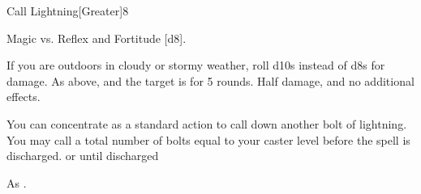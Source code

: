 \begin{spellsection}{Call Lightning}[Greater]{8}
\begin{spellheader}
\end{spellheader}
\begin{spellcontent}
    \begin{spelltargetinginfo}
    \end{spelltargetinginfo}
    \begin{spelleffects}
        \begin{spellattack}{Magic vs. Reflex and Fortitude}
            \spellsuccess[Reflex] [d8].
            
            If you are outdoors in cloudy or stormy weather, roll d10s instead of d8s for damage.
             As above, and the target is \staggered for 5 rounds.
            \spellfailure[Reflex] Half damage, and no additional effects.
        \end{spellattack}
        \spelleffect You can concentrate as a standard action to call down another bolt of lightning. You may call a total number of bolts equal to your caster level before the spell is discharged.
        \spelldur \durmed or until discharged \dismissable
    \end{spelleffects}
\end{spellcontent}
\begin{spellfooter}
    \spellnotes As .
\end{spellfooter}
\end{spellsection}

